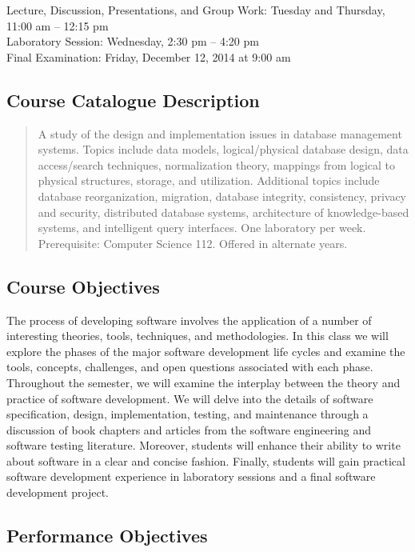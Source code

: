 Lecture, Discussion, Presentations, and Group Work: Tuesday and Thursday, 11:00 am -- 12:15 pm \\
Laboratory Session: Wednesday, 2:30 pm -- 4:20 pm \\
Final Examination: Friday, December 12, 2014 at 9:00 am

\subsection*{Course Catalogue Description}

\begin{quote}

  A study of the design and implementation issues in database management systems. Topics include data models,
  logical/physical database design, data access/search techniques, normalization theory, mappings from logical to physical
  structures, storage, and utilization. Additional topics include database reorganization, migration, database integrity,
  consistency, privacy and security, distributed database systems, architecture of knowledge-based systems, and
  intelligent query interfaces. One laboratory per week. Prerequisite: Computer Science 112.  Offered in alternate years.

\end{quote}

\subsection*{Course Objectives}

The process of developing software involves the application of a number of interesting theories, tools, techniques, and
methodologies.  In this class we will explore the phases of the major software development life cycles and examine the
tools, concepts, challenges, and open questions associated with each phase.  Throughout the semester, we will examine
the interplay between the theory and practice of software development.  We will delve into the details of software
specification, design, implementation, testing, and maintenance through a discussion of book chapters and articles from
the software engineering and software testing literature.  Moreover, students will enhance their ability to write about
software in a clear and concise fashion.  Finally, students will gain practical software development experience in
laboratory sessions and a final software development project.

\subsection*{Performance Objectives}

